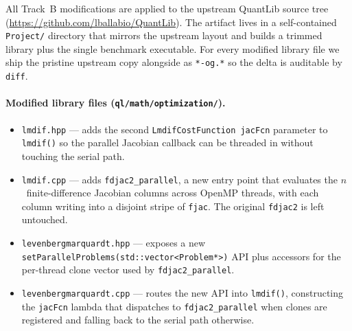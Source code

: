 \documentclass[11pt,twocolumn]{article}
\begin{document}
All Track~B modifications are applied to the upstream
QuantLib source tree~\cite{quantlib_repo}
(\url{https://github.com/lballabio/QuantLib}).  The artifact lives in
a self-contained \texttt{Project/} directory that mirrors the upstream
layout and builds a trimmed library plus the single benchmark
executable.  For every modified library file we ship the pristine
upstream copy alongside as \texttt{*-og.*} so the delta is auditable by
\texttt{diff}.

\paragraph{Modified library files (\texttt{ql/math/optimization/}).}
\begin{itemize}[noitemsep]
  \item \texttt{lmdif.hpp} --- adds the second
    \texttt{LmdifCostFunction jacFcn} parameter to
    \texttt{lmdif()} so the parallel Jacobian callback can be
    threaded in without touching the serial path.
  \item \texttt{lmdif.cpp} --- adds
    \texttt{fdjac2\_parallel}, a new entry point that evaluates the
    $n$~finite-difference Jacobian columns across OpenMP threads,
    with each column writing into a disjoint stripe of \texttt{fjac}.
    The original \texttt{fdjac2} is left untouched.
  \item \texttt{levenbergmarquardt.hpp} --- exposes a new
    \texttt{setParallelProblems(std::vector<Problem*>)} API plus
    accessors for the per-thread clone vector used by
    \texttt{fdjac2\_parallel}.
  \item \texttt{levenbergmarquardt.cpp} --- routes the new API into
    \texttt{lmdif()}, constructing the \texttt{jacFcn} lambda that
    dispatches to \texttt{fdjac2\_parallel} when clones are
    registered and falling back to the serial path otherwise.
\end{itemize}
\end{document}
